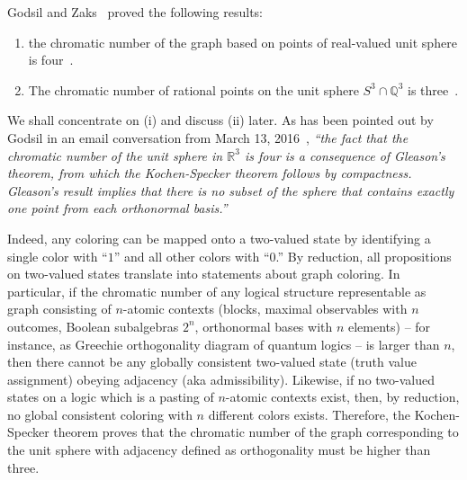\documentclass[%
  twocolumn,
 showpacs,
 showkeys,
 preprintnumbers,
 amsmath,amssymb,
 aps,
  pra,
  longbibliography,
 floatfix,
 ]{revtex4-1}
\begin{document}
Godsil and Zaks~\cite{godsil-zaks,havlicek-2000}  proved the following results:
\begin{enumerate}
\item
the chromatic number of the graph based on points of real-valued unit sphere
is four~\cite[Lemma~1.1]{godsil-zaks}.
\item
The chromatic number of rational points on the  unit sphere
$S^3\cap \mathbb{Q}^3$
is three~\cite[Lemma~1.2]{godsil-zaks}.
\end{enumerate}

We shall concentrate on (i) and discuss (ii) later.
As has been pointed out by Godsil in an email conversation from March 13, 2016~\cite{godsil-pc},
{\em ``the fact that the chromatic number of the unit sphere in $\mathbb{R}^3$
is four is a consequence of  Gleason's theorem,
from which the Kochen-Specker theorem follows by compactness.
Gleason's result implies that there is no subset of the sphere that contains exactly one point from each orthonormal basis.''}

Indeed, any coloring can be mapped onto a two-valued state by identifying
a single color with ``$1$'' and all other colors with ``$0$.''
By reduction, all propositions on two-valued states translate into statements about graph coloring.
In particular, if the chromatic number of any logical structure representable as graph consisting of $n$-atomic
contexts
(blocks, maximal observables with $n$ outcomes, Boolean subalgebras $2^n$, orthonormal bases with $n$ elements)
--
for instance, as Greechie orthogonality diagram of quantum logics
--
is larger than $n$,
then there cannot be any globally consistent two-valued state (truth value assignment) obeying adjacency (aka admissibility).
Likewise, if no two-valued states  on a logic
which is a pasting of $n$-atomic contexts
exist, then, by reduction, no global consistent coloring with $n$ different colors exists.
Therefore, the Kochen-Specker theorem proves that the chromatic number of the graph corresponding to
the unit sphere with adjacency defined as orthogonality must be higher than three.




\end{document}
